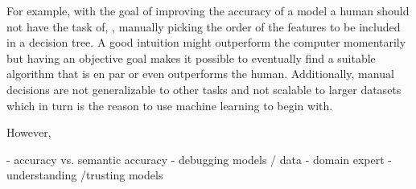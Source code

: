 For example, with the goal of improving the accuracy of a model a human should not have the task of, \eg, manually picking the order of the features to be included in a decision tree.
A good intuition might outperform the computer momentarily but having an objective goal makes it possible to eventually find a suitable algorithm that is en par or even outperforms the human.
Additionally, manual decisions are not generalizable to other tasks and not scalable to larger datasets which in turn is the reason to use machine learning to begin with.

However, \todo{}

- accuracy vs. semantic accuracy
- debugging models / data
- domain expert
- understanding /trusting models